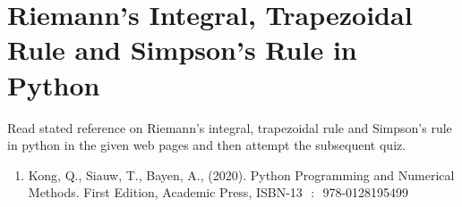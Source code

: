 


\section{Riemann's Integral, Trapezoidal Rule and Simpson's Rule in Python}
\activities
Read stated reference on Riemann's integral, trapezoidal rule and Simpson's rule in python in the given web pages and then attempt the subsequent quiz.
\begin{activity}[\cg Reading]
\begin{enumerate}
\item Kong, Q., Siauw, T., Bayen, A., (2020). Python Programming and Numerical Methods. First Edition, Academic Press,  ISBN-13 ‏ : ‎ 978-0128195499 \\
\\
\\
\end{enumerate}
\end{activity}
%



%
%
%
%
%
%
%
%
%



